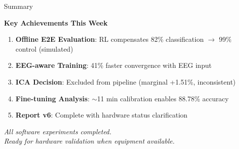 \documentclass[aspectratio=169, 11pt]{beamer}
\begin{document}
\begin{frame}{Summary}
    \begin{center}
    \Large
    \textbf{Key Achievements This Week}
    \end{center}
    
    \vspace{5mm}
    
    \begin{enumerate}
        \item \textbf{Offline E2E Evaluation}: RL compensates 82\% classification $\rightarrow$ 99\% control (simulated)
        \item \textbf{EEG-aware Training}: 41\% faster convergence with EEG input
        \item \textbf{ICA Decision}: Excluded from pipeline (marginal +1.51\%, inconsistent)
        \item \textbf{Fine-tuning Analysis}: $\sim$11 min calibration enables 88.78\% accuracy
        \item \textbf{Report v6}: Complete with hardware status clarification
    \end{enumerate}
    
    \vspace{10mm}
    
    \begin{center}
    \textit{All software experiments completed.}\\
    \textit{Ready for hardware validation when equipment available.}
    \end{center}
\end{frame}
\end{document}
